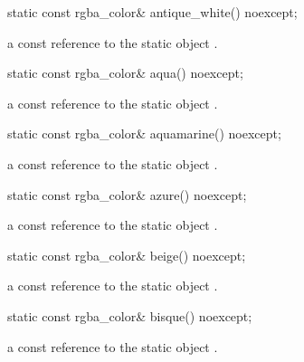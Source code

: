 \begin{itemdecl}
static const rgba_color& antique_white() noexcept;
\end{itemdecl}
\begin{itemdescr}
\pnum
\returns
a const reference to the static  object .
\end{itemdescr}

\begin{itemdecl}
static const rgba_color& aqua() noexcept;
\end{itemdecl}
\begin{itemdescr}
\pnum
\returns
a const reference to the static  object .
\end{itemdescr}

\begin{itemdecl}
static const rgba_color& aquamarine() noexcept;
\end{itemdecl}
\begin{itemdescr}
\pnum
\returns
a const reference to the static  object .
\end{itemdescr}

\begin{itemdecl}
static const rgba_color& azure() noexcept;
\end{itemdecl}
\begin{itemdescr}
\pnum
\returns
a const reference to the static  object .
\end{itemdescr}

\begin{itemdecl}
static const rgba_color& beige() noexcept;
\end{itemdecl}
\begin{itemdescr}
\pnum
\returns
a const reference to the static  object .
\end{itemdescr}

\begin{itemdecl}
static const rgba_color& bisque() noexcept;
\end{itemdecl}
\begin{itemdescr}
\pnum
\returns
a const reference to the static  object .
\end{itemdescr}

